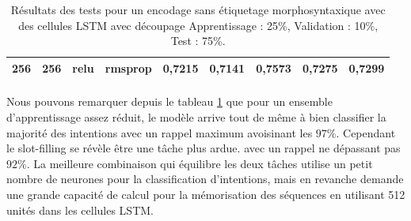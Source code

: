 \begin{table}[H]
{\begin{tabular}{|c|c|c|c|c|c|c|c|c|}
				256                                                                   & 256                                                            & relu                & rmsprop                & 0,7215                                                                 & 0,7141                                                              & 0,7573                                                                            & 0,7275                                                                         & 0,7299                                                               \\ \hline
			\end{tabular}%
		}
		\caption{Résultats des tests pour un encodage sans étiquetage morphosyntaxique avec des cellules LSTM avec découpage Apprentissage : 25\%, Validation : 10\%, Test : 75\%.}
		\label{tab:lstm_1}
	\end{table}
	
	\paragraph{}
	Nous pouvons remarquer depuis le tableau \ref{tab:lstm_1} que pour un ensemble d'apprentissage assez réduit, le modèle arrive tout de même à bien classifier la majorité des intentions avec un rappel maximum avoisinant les $97\%$. Cependant le slot-filling se révèle être une tâche plus ardue. avec un rappel ne dépassant pas $92\%$. La meilleure combinaison qui équilibre les deux tâches utilise un petit nombre de neurones pour la classification d'intentions, mais en revanche demande une grande capacité de calcul pour la mémorisation des séquences en utilisant 512 unités dans les cellules LSTM.
	
